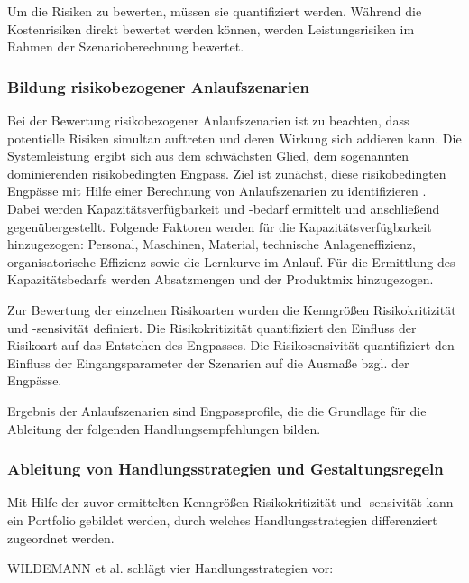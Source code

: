 Um die Risiken zu bewerten, müssen sie quantifiziert werden. Während die Kostenrisiken direkt bewertet werden können, werden Leistungsrisiken im Rahmen der Szenarioberechnung bewertet. 

\subsubsection*{Bildung risikobezogener Anlaufszenarien}\label{sec:wildemannszenarien}
Bei der Bewertung risikobezogener Anlaufszenarien ist zu beachten, dass potentielle Risiken simultan auftreten und deren Wirkung sich addieren kann. Die Systemleistung ergibt sich aus dem schwächsten Glied, dem sogenannten dominierenden risikobedingten Engpass. Ziel ist zunächst, diese risikobedingten Engpässe mit Hilfe einer Berechnung von Anlaufszenarien zu identifizieren \autocite{Fleischer2003}. 
Dabei werden Kapazitätsverfügbarkeit und -bedarf ermittelt und anschließend gegenübergestellt. Folgende Faktoren werden für die Kapazitätsverfügbarkeit hinzugezogen: Personal, Maschinen, Material, technische Anlageneffizienz, organisatorische Effizienz sowie die Lernkurve im Anlauf.
Für die Ermittlung des Kapazitätsbedarfs werden Absatzmengen und der Produktmix hinzugezogen. 

Zur Bewertung der einzelnen Risikoarten wurden die Kenngrößen Risikokritizität und -sensivität definiert. 
Die Risikokritizität quantifiziert den Einfluss der Risikoart auf das Entstehen des Engpasses. Die Risikosensivität quantifiziert den Einfluss der Eingangsparameter der Szenarien auf die Ausmaße bzgl. der Engpässe. 

Ergebnis der Anlaufszenarien sind Engpassprofile, die die Grundlage für die Ableitung der folgenden Handlungsempfehlungen bilden. 

\subsubsection*{Ableitung von Handlungsstrategien und Gestaltungsregeln}

Mit Hilfe der zuvor ermittelten Kenngrößen Risikokritizität und -sensivität kann ein Portfolio gebildet werden, durch welches Handlungsstrategien differenziert zugeordnet werden. 

WILDEMANN et al. schlägt vier Handlungsstrategien vor: 

